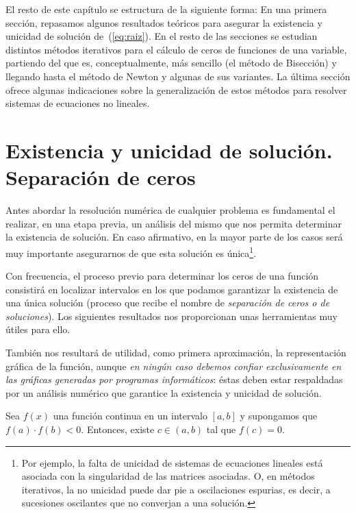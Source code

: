 El resto de este capítulo se estructura de la siguiente forma: En una
primera sección, repasamos algunos resultados teóricos para asegurar
la existencia y unicidad de solución de~(\ref{eq:raiz}). En el resto
de las secciones se estudian distintos métodos iterativos para el
cálculo de ceros de funciones de una variable, partiendo del que es,
conceptualmente, más sencillo (el método de Bisección) y llegando
hasta el método de Newton y algunas de sus variantes.  La última
sección ofrece algunas indicaciones sobre la generalización de estos
métodos para resolver sistemas de ecuaciones no lineales.

\section{Existencia y unicidad de solución. Separación de ceros}
\label{sec:tema1:exist-y-unic}

Antes abordar la resolución numérica de cualquier problema es
fundamental el realizar, en una etapa previa, un análisis del mismo
que nos permita determinar la existencia de solución. En caso
afirmativo, en la mayor parte de los casos será muy importante
asegurarnos de que esta solución es única\footnote{Por ejemplo,
  la falta de unicidad de sistemas de ecuaciones lineales está
  asociada con la singularidad de las matrices asociadas. O, en
  métodos iterativos, la no unicidad puede dar pie a
  oscilaciones espurias, es decir, a sucesiones oscilantes que no
  converjan a una solución.}.

Con frecuencia, el proceso previo para determinar los ceros de una
función consistirá en localizar intervalos en los que podamos
garantizar la existencia de una única solución (proceso que recibe el
nombre de \textit{separación de ceros o de soluciones}). Los
siguientes resultados nos proporcionan unas herramientas muy útiles
para ello.

También nos resultará de utilidad, como primera aproximación, la
representación gráfica de la función, aunque \textit{en ningún caso
  debemos confiar exclusivamente en las gráficas generadas por
  programas informáticos}: éstas deben estar respaldadas por un
análisis numérico que garantice la existencia y unicidad de solución.

\begin{theorem}[Bolzano]
  \label{thm:rolle}
  Sea $f(x)$ una función continua en un intervalo $[a, b]$ y
  supongamos que $f (a)\cdot f (b) < 0$.  Entonces, existe
  $c\in(a, b)$ tal que $f (c) = 0$.
\end{theorem}

